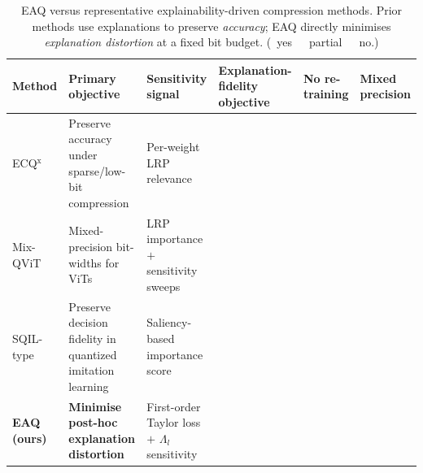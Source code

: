 \documentclass{ieeeaccess}
\newcommand{\yes}{\textcolor{eaqteal}{\ding{51}}}
\newcommand{\no}{\textcolor{eaqred}{\ding{55}}}
\newcommand{\partialmark}{\textcolor{eaqamber}{\ding{108}}}
\begin{document}
\begin{table}[!t]
\caption{EAQ versus representative explainability-driven compression methods.
Prior methods use explanations to preserve \emph{accuracy}; EAQ directly
minimises \emph{explanation distortion} at a fixed bit budget.
(\yes~yes\ \ \partialmark~partial\ \ \no~no.)}
\label{tab:xaicomp}
\centering
\footnotesize
\renewcommand{\arraystretch}{1.25}
\begin{tabular}{p{2.1cm} p{3.5cm} p{3.4cm} >{\centering}p{1.9cm}
>{\centering}p{1.5cm} >{\centering\arraybackslash}p{1.6cm}}
\hline
\textbf{Method} & \textbf{Primary objective} & \textbf{Sensitivity signal} &
\textbf{Explanation-fidelity objective} & \textbf{No re-training} &
\textbf{Mixed precision}\\
\hline
ECQ$^{\mathrm x}$ \cite{becking2022ecq} & Preserve accuracy under sparse/low-bit
compression & Per-weight LRP relevance & \no & \no & \partialmark\\
Mix-QViT \cite{ranjan2025mixqvit} & Mixed-precision bit-widths for ViTs &
LRP importance $+$ sensitivity sweeps & \no & \yes & \yes\\
SQIL-type \cite{lin2024quantimit} & Preserve decision fidelity in quantized
imitation learning & Saliency-based importance score & \no & \no & \no\\
\textbf{EAQ (ours)} & \textbf{Minimise post-hoc explanation distortion} &
First-order Taylor loss $+$ $\Lambda_l$ sensitivity & \yes & \yes & \yes\\
\hline
\end{tabular}
\end{table}












\newpage


\EOD
\end{document}
